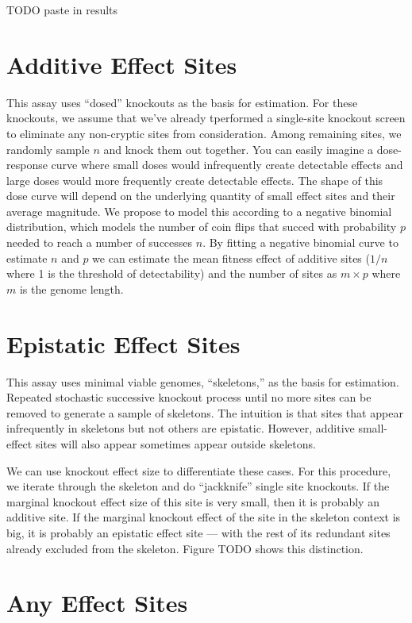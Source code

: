 TODO paste in results

\section{Additive Effect Sites}

This assay uses ``dosed'' knockouts as the basis for estimation.
For these knockouts, we assume that we've already tperformed a single-site knockout screen to eliminate any non-cryptic sites from consideration.
Among remaining sites, we randomly sample $n$ and knock them out together.
You can easily imagine a dose-response curve where small doses would infrequently create detectable effects and large doses would more frequently create detectable effects.
The shape of this dose curve will depend on the underlying quantity of small effect sites and their average magnitude.
We propose to model this according to a negative binomial distribution, which models the number of coin flips that succed with probability $p$ needed to reach a number of successes $n$.
By fitting a negative binomial curve to estimate $n$ and $p$ we can estimate the mean fitness effect of additive sites ($1/n$ where 1 is the threshold of detectability) and the number of sites as $m \times p$ where $m$ is the genome length.

\section{Epistatic Effect Sites}

This assay uses minimal viable genomes, ``skeletons,'' as the basis for estimation.
Repeated stochastic successive knockout process until no more sites can be removed to generate a sample of skeletons.
The intuition is that sites that appear infrequently in skeletons but not others are epistatic.
However, additive small-effect sites will also appear sometimes appear outside skeletons.

We can use knockout effect size to differentiate these cases.
For this procedure, we iterate through the skeleton and do ``jackknife'' single site knockouts.
If the marginal knockout effect size of this site is very small, then it is probably an additive site.
If the marginal knockout effect of the site in the skeleton context is big, it is probably an epistatic effect site --- with the rest of its redundant sites already excluded from the skeleton.
Figure TODO shows this distinction.

\section{Any Effect Sites}

